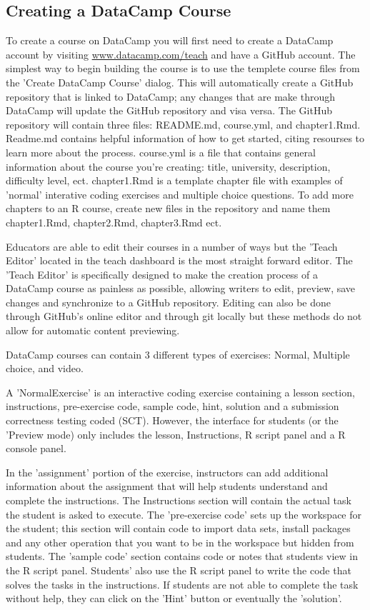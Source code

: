 \documentclass{tise_style}
\begin{document}
\subsection{Creating a DataCamp Course}
To create a course on DataCamp you will first need to create a DataCamp account by visiting \url{www.datacamp.com/teach} and
have a GitHub account. The simplest way to begin building the course is to use the templete course files from the 'Create
DataCamp Course' dialog. This will automatically create a GitHub repository that is linked to DataCamp; any changes that are
make through DataCamp will update the GitHub repository and visa versa. The GitHub repository will contain three files:
README.md, course.yml, and chapter1.Rmd.
Readme.md contains helpful information of how to get started, citing resourses to learn more about the process.
course.yml is a file that contains general information about the course you're creating: title, university, description,
difficulty level, ect.
chapter1.Rmd is a template chapter file with examples of 'normal' interative coding exercises and multiple choice questions.
To add more chapters to an R course, create new files in the repository and name them chapter1.Rmd, chapter2.Rmd, chapter3.Rmd
ect.

Educators are able to edit their courses in a number of ways but the 'Teach Editor' located in the teach dashboard is the
most straight forward editor. The 'Teach Editor' is specifically designed to make the creation process of a DataCamp course
as painless as possible, allowing writers to edit, preview, save changes and synchronize to a GitHub repository. Editing can
also be done through GitHub's online editor and through git locally but these methods do not allow for automatic content
previewing.

DataCamp courses can contain 3 different types of exercises: Normal, Multiple choice, and video.

A 'NormalExercise' is an interactive coding exercise containing a lesson section, instructions, pre-exercise code, sample
code, hint, solution and a submission correctness testing coded (SCT). However, the interface for students (or the 'Preview
mode) only includes the lesson, Instructions, R script panel and a R console panel.

In the 'assignment' portion of the exercise, instructors can add additional information about the assignment that will help
students understand and complete the instructions. The Instructions section will contain the actual task the student is
asked to execute. The 'pre-exercise code' sets up the workspace for the student; this section will contain code to import
data sets, install packages and any other operation that you want to be in the workspace but hidden from students. The 'sample
code' section contains code or notes that students view in the R script panel. Students' also use the R script panel to write
the code that solves the tasks in the instructions. If students are not able to complete the task without help, they can click
on the 'Hint' button or eventually the 'solution'.
\end{document}
